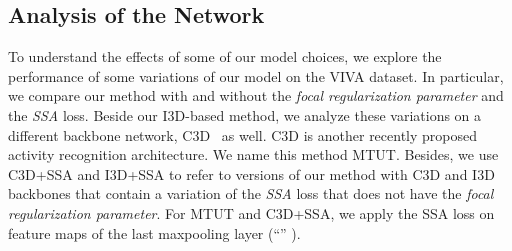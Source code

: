 \documentclass[10pt,twocolumn,letterpaper]{article}
\begin{document}
\begin{table}[t]
\begin{center}
\vspace{0.5mm}
\caption{Accuracies of different multimodal fusion hand gesture methods on the NVGesture dataset~\cite{cao2017egocentric}. The top performer is denoted by boldface.} \label{tbl:multi_nv}
\end{center}
\vspace{-5.5mm}
\end{table}

\subsection{Analysis of the Network}
To understand the effects of some of our model choices, we explore the performance of some variations of our model on the VIVA dataset.  In particular, we compare our method with and without the \emph{focal regularization parameter} and the \emph{SSA} loss. Beside our I3D-based method, we analyze these variations on a different backbone network, C3D~\cite{tran2015learning} as well. C3D  is another recently proposed activity recognition architecture. We name this method MTUT.  Besides, we use C3D+SSA and I3D+SSA to refer to versions of our method with C3D and I3D backbones that contain a variation of the \emph{SSA} loss that does not have the \emph{focal regularization parameter}.    For MTUT and C3D+SSA, we apply the SSA loss on feature maps of the last maxpooling layer (``'' ).
  
\end{document}
